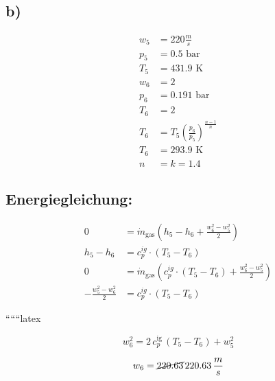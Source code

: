 

\subsection*{b)}

\begin{align*}
    w_5 &= 220 \frac{m}{s} \\
    p_5 &= 0.5 \text{ bar} \\
    T_5 &= 431.9 \text{ K} \\
    w_6 &= 2 \\
    p_6 &= 0.191 \text{ bar} \\
    T_6 &= 2 \\
    T_6 &= T_5 \left( \frac{p_6}{p_5} \right)^{\frac{n-1}{n}} \\
    T_6 &= 293.9 \text{ K} \\
    n &= k = 1.4
\end{align*}

\subsection*{Energiegleichung:}

\begin{align*}
    0 &= \dot{m}_{\text{gas}} \left( h_5 - h_6 + \frac{w_6^2 - w_5^2}{2} \right) \\
    h_5 - h_6 &= c_p^{ig} \cdot (T_5 - T_6) \\
    0 &= \dot{m}_{\text{gas}} \left( c_p^{ig} \cdot (T_5 - T_6) + \frac{w_6^2 - w_5^2}{2} \right) \\
    -\frac{w_5^2 - w_6^2}{2} &= c_p^{ig} \cdot (T_5 - T_6)
\end{align*}

``````latex

\[
w_{6}^2 = 2 \, c_p^{\text{ig}} \, \left( T_5 - T_6 \right) + w_{5}^2
\]

\[
w_6 = \cancel{220.63} \, 220.63 \, \frac{m}{s}
\]